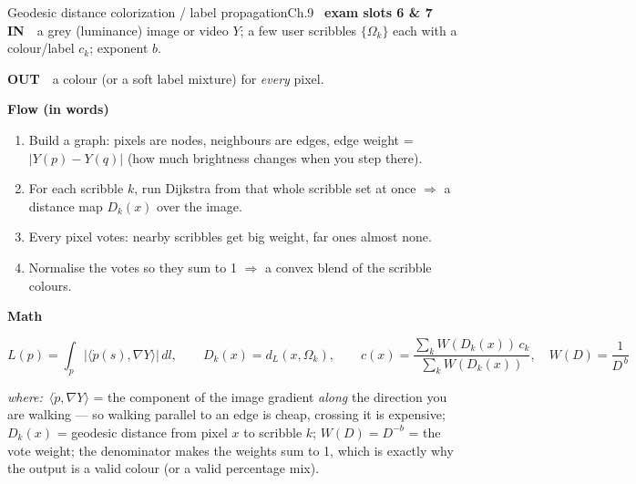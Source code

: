 \documentclass[9pt,a4paper]{extarticle}
\newcommand{\IN}{\textbf{\color{cIn}IN}\ }
\newcommand{\OUT}{\par\textbf{\color{cOut}OUT}\ }
\newcommand{\FLOW}{\par\smallskip\textbf{Flow (in words)}\par\nopagebreak}
\newcommand{\MATH}{\par\smallskip\textbf{Math}\par\nopagebreak}
\newcommand{\WHERE}{\par\textit{where:}\ }
\begin{document}
\begin{card}{Geodesic distance colorization / label propagation}{Ch.9 \textbullet\ \textbf{exam slots 6 \& 7}}
\IN\ a grey (luminance) image or video $Y$; a few user scribbles $\{\Omega_k\}$ each with a colour/label $c_k$; exponent $b$.
\OUT\ a colour (or a soft label mixture) for \emph{every} pixel.

\FLOW
\begin{enumerate}
  \item Build a graph: pixels are nodes, neighbours are edges, edge weight = $|Y(p)-Y(q)|$ (how much brightness changes when you step there).
  \item For each scribble $k$, run Dijkstra from that whole scribble set at once $\Rightarrow$ a distance map $D_k(x)$ over the image.
  \item Every pixel votes: nearby scribbles get big weight, far ones almost none.
  \item Normalise the votes so they sum to 1 $\Rightarrow$ a convex blend of the scribble colours.
\end{enumerate}

\MATH
\[ L(p)=\int_p|\langle \dot p(s),\nabla Y\rangle|\,dl,\qquad
D_k(x)=d_L(x,\Omega_k),\qquad
c(x)=\frac{\sum_k W(D_k(x))\,c_k}{\sum_k W(D_k(x))},\quad W(D)=\frac{1}{D^{\,b}} \]
\WHERE $\langle\dot p,\nabla Y\rangle$ = the component of the image gradient \emph{along} the direction you are walking --- so walking parallel to an edge is cheap, crossing it is expensive; $D_k(x)$ = geodesic distance from pixel $x$ to scribble $k$; $W(D)=D^{-b}$ = the vote weight; the denominator makes the weights sum to 1, which is exactly why the output is a valid colour (or a valid percentage mix).


\end{card}
\end{document}
